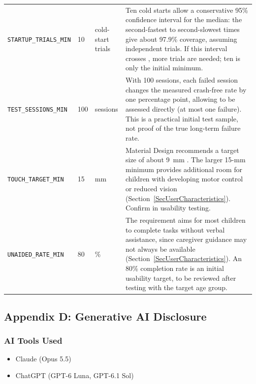 \documentclass[10pt]{article}
\newcommand{\constref}[1]{%
    \hyperref[const:#1]{\texttt{\detokenize{#1}}}%
}
\begin{document}
\begin{longtable}{>{\raggedright\arraybackslash}p{} p{} >{\raggedright\arraybackslash}p{} >{\raggedright\arraybackslash}p{}}
\texttt{STARTUP\_TRIALS\_MIN}
\label{const:STARTUP_TRIALS_MIN}
& 10 & cold-start trials & Ten cold starts allow a conservative 95\% confidence interval for the median: the second-fastest to second-slowest times give about 97.9\% coverage, assuming independent trials. If this interval crosses \constref{STARTUP_MAX_S}, more trials are needed; ten is only the initial minimum. \\

\texttt{TEST\_SESSIONS\_MIN}
\label{const:TEST_SESSIONS_MIN}
& 100 & sessions & With 100 sessions, each failed session changes the measured crash-free rate by one percentage point, allowing \constref{CRASH_FREE_RATE_MIN} to be assessed directly (at most one failure). This is a practical initial test sample, not proof of the true long-term failure rate. \\

\texttt{TOUCH\_TARGET\_MIN}
\label{const:TOUCH_TARGET_MIN}
& 15 & mm & Material Design recommends a target size of about 9~mm \cite{MaterialDesign}. The larger 15-mm minimum provides additional room for children with developing motor control or reduced vision (Section~\ref{SecUserCharacteristics}). Confirm in usability testing. \\

\texttt{UNAIDED\_RATE\_MIN}
\label{const:UNAIDED_RATE_MIN}
& 80 & \% & The requirement aims for most children to complete tasks without verbal assistance, since caregiver guidance may not always be available (Section~\ref{SecUserCharacteristics}). An 80\% completion rate is an initial usability target, to be reviewed after testing with the target age group. \\

\end{longtable}

\newpage
\subsection{Appendix D: Generative AI Disclosure}

\subsubsection*{AI Tools Used}

\begin{itemize}
    \item Claude (Opus 5.5)
    \item ChatGPT (GPT-6 Luna, GPT-6.1 Sol)
\end{itemize}
\end{document}
